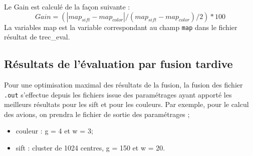 \documentclass[a4paper, 11pt]{article}
\begin{document}
\begin{center}
\end{center}
Le Gain est calculé de la façon suivante :
\begin{equation}
  Gain = (| map_{sift} - map_{color} | / (map_{sift} - map_{color}) / 2) * 100
\end{equation}
La variables map est la variable correspondant au champ \texttt{map}  dans le fichier résultat de trec\_eval.

\subsection{Résultats de l'évaluation par fusion tardive}

Pour une optimisation maximal des résultats de la fusion, la fusion des fichier \texttt{.out} s'effectue depuis les fichiers issue des paramétrages ayant apporté les meilleurs résultats pour les sift et pour les couleurs.
Par exemple, pour le calcul des avions, on prendra le fichier de sortie des paramétrages ;
\begin{itemize}
	\item couleur : g = 4 et w = 3;
	\item sift : cluster de 1024 centres, g = 150 et w = 20.
\end{itemize}

\begin{center}
\end{center}
\end{document}
